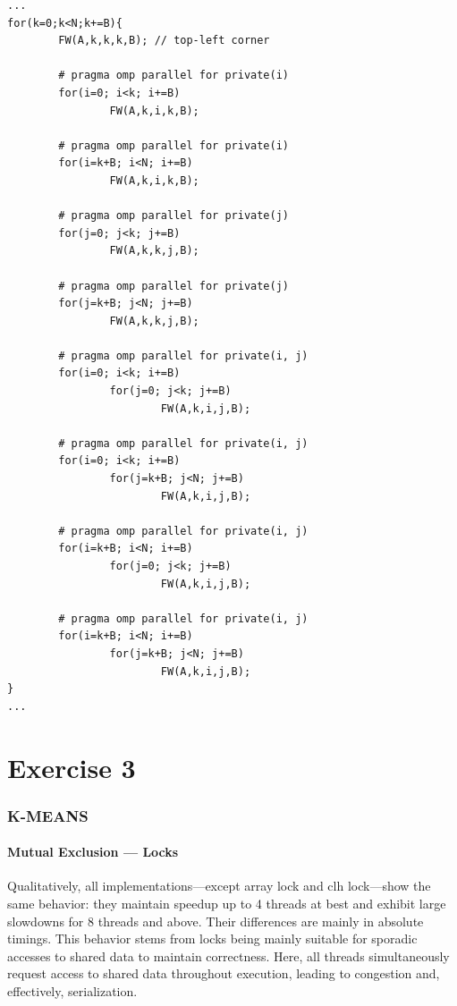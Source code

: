\documentclass{article}
\newcommand{\eng}[1]{#1}
\begin{document}
\begin{lstlisting}[caption={FW Tiled}, style=CStyle, label={lst:fw-tiled}]
...
for(k=0;k<N;k+=B){
        FW(A,k,k,k,B); // top-left corner

        # pragma omp parallel for private(i)
        for(i=0; i<k; i+=B)
                FW(A,k,i,k,B);

        # pragma omp parallel for private(i)
        for(i=k+B; i<N; i+=B)
                FW(A,k,i,k,B);

        # pragma omp parallel for private(j)
        for(j=0; j<k; j+=B)
                FW(A,k,k,j,B);

        # pragma omp parallel for private(j)
        for(j=k+B; j<N; j+=B)
                FW(A,k,k,j,B);

        # pragma omp parallel for private(i, j)
        for(i=0; i<k; i+=B)
                for(j=0; j<k; j+=B)
                        FW(A,k,i,j,B);

        # pragma omp parallel for private(i, j)
        for(i=0; i<k; i+=B)
                for(j=k+B; j<N; j+=B)
                        FW(A,k,i,j,B);

        # pragma omp parallel for private(i, j)
        for(i=k+B; i<N; i+=B)
                for(j=0; j<k; j+=B)
                        FW(A,k,i,j,B);

        # pragma omp parallel for private(i, j)
        for(i=k+B; i<N; i+=B)
                for(j=k+B; j<N; j+=B)
                        FW(A,k,i,j,B);
}
...
\end{lstlisting}

\clearpage
\part{Exercise 3}

\section{\eng{K-MEANS}}

\subsection{Mutual Exclusion — Locks}

Qualitatively, all implementations—except \eng{array lock} and \eng{clh lock}—show the same behavior: they maintain speedup up to 4 threads at best and exhibit large slowdowns for 8 threads and above. Their differences are mainly in absolute timings. This behavior stems from locks being mainly suitable for sporadic accesses to shared data to maintain correctness. Here, all threads simultaneously request access to shared data throughout execution, leading to congestion and, effectively, serialization.
\end{document}
